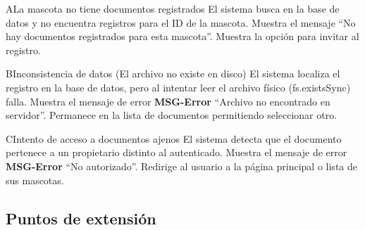 
\begin{UCtrayectoriaA}{A}{La mascota no tiene documentos registrados}
    \UCpaso El sistema busca en la base de datos y no encuentra registros para el ID de la mascota.     \UCpaso Muestra el mensaje ``No hay documentos registrados para esta mascota''.     \UCpaso Muestra la opción  para invitar al registro.
\end{UCtrayectoriaA}

\begin{UCtrayectoriaA}{B}{Inconsistencia de datos (El archivo no existe en disco)}
    \UCpaso El sistema localiza el registro en la base de datos, pero al intentar leer el archivo físico (fs.existsSync) falla.     \UCpaso Muestra el mensaje de error {\bf MSG-Error} ``Archivo no encontrado en servidor''.     \UCpaso Permanece en la lista de documentos permitiendo seleccionar otro.
\end{UCtrayectoriaA}

\begin{UCtrayectoriaA}{C}{Intento de acceso a documentos ajenos}
    \UCpaso El sistema detecta que el documento pertenece a un propietario distinto al autenticado.     \UCpaso Muestra el mensaje de error {\bf MSG-Error} ``No autorizado''.     \UCpaso Redirige al usuario a la página principal o lista de sus mascotas.
\end{UCtrayectoriaA}

\subsection{Puntos de extensión}

